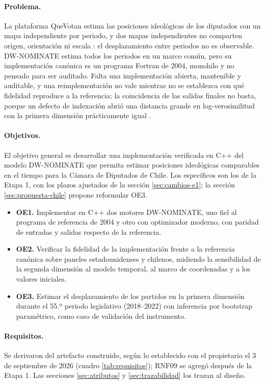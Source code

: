 \paragraph{Problema.} La plataforma QueVotan estima las posiciones ideológicas de los
diputados con un mapa independiente por periodo, y dos mapas independientes no comparten
origen, orientación ni escala \parencite{herron2004scale}: el desplazamiento entre periodos no
es observable. DW-NOMINATE \parencite{poole2005spatial} estima todos los periodos en un marco
común, pero su implementación canónica es un programa Fortran de 2004, monohilo y no pensado
para ser auditado. Falta una implementación abierta, mantenible y auditable, y una
reimplementación no vale mientras no se establezca con qué fidelidad reproduce a la
referencia; la coincidencia de las salidas finales no basta, porque un defecto de indexación
abrió una distancia grande en log-verosimilitud con la primera dimensión prácticamente igual
\parencite{nieves2026jcc}.

\paragraph{Objetivos.} El objetivo general es desarrollar una implementación verificada en
C++ del modelo DW-NOMINATE que permita estimar posiciones ideológicas comparables en el
tiempo para la Cámara de Diputados de Chile. Los específicos son los de la Etapa 1, con los
plazos ajustados de la sección \ref{sec:cambios-e1}; la sección \ref{sec:propuesta-chile}
propone reformular OE3.
\begin{itemize}
  \item \textbf{OE1.} Implementar en C++ dos motores DW-NOMINATE, uno fiel al programa de
  referencia de 2004 y otro con optimizador moderno, con paridad de entradas y salidas
  respecto de la referencia.
  \item \textbf{OE2.} Verificar la fidelidad de la implementación frente a la referencia
  canónica sobre paneles estadounidenses y chilenos, midiendo la sensibilidad de la segunda
  dimensión al modelo temporal, al marco de coordenadas y a los valores iniciales.
  \item \textbf{OE3.} Estimar el desplazamiento de los partidos en la primera dimensión
  durante el 55.º periodo legislativo (2018--2022) con inferencia por bootstrap paramétrico,
  como caso de validación del instrumento.
\end{itemize}

\paragraph{Requisitos.} Se derivaron del artefacto construido, según lo establecido con el
propietario el 3 de septiembre de 2026 (cuadro \ref{tab:requisitos}); RNF09 se agregó después
de la Etapa 1. Las secciones \ref{sec:atributos} y \ref{sec:trazabilidad} los trazan al
diseño.


